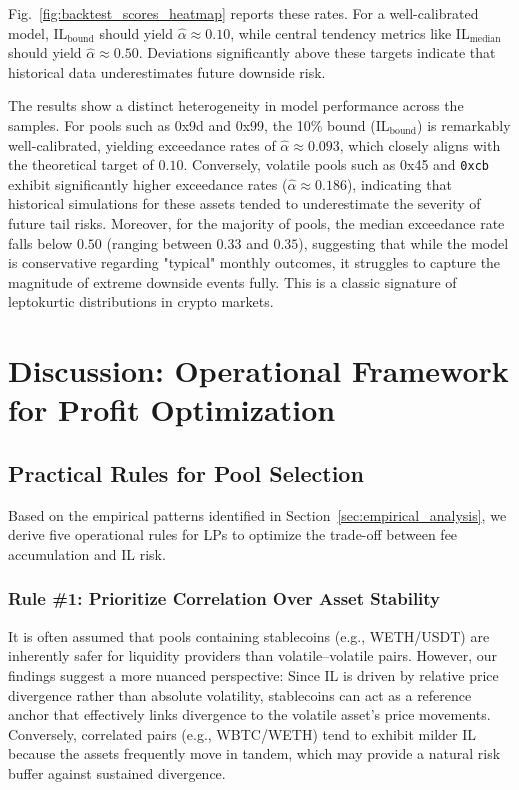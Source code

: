 \documentclass[journal]{IEEEtran}
\begin{document}
Fig.~\ref{fig:backtest_scores_heatmap} reports these rates. 
For a well-calibrated model, $\mathrm{IL}_{\text{bound}}$ should yield $\hat{\alpha} \approx 0.10$, while central tendency metrics like $\mathrm{IL}_{\text{median}}$ should yield $\hat{\alpha} \approx 0.50$. 
Deviations significantly above these targets indicate that historical data underestimates future downside risk.

The results show a distinct heterogeneity in model performance across the samples. 
For pools such as 0x9d and 0x99, the 10\% bound ($\mathrm{IL}_{\text{bound}}$) is remarkably well-calibrated, yielding exceedance rates of $\hat{\alpha} \approx 0.093$, which closely aligns with the theoretical target of $0.10$. 
Conversely, volatile pools such as 0x45 and \texttt{0xcb} exhibit significantly higher exceedance rates ($\hat{\alpha} \approx 0.186$), indicating that historical simulations for these assets tended to underestimate the severity of future tail risks. 
Moreover, for the majority of pools, the median exceedance rate falls below $0.50$ (ranging between $0.33$ and $0.35$), suggesting that while the model is conservative regarding "typical" monthly outcomes, it struggles to capture the magnitude of extreme downside events fully. This is a classic signature of leptokurtic distributions in crypto markets.

\section{Discussion: Operational Framework for Profit Optimization}
\label{sec:discussion}

\subsection{Practical Rules for Pool Selection}
Based on the empirical patterns identified in Section~\ref{sec:empirical_analysis}, we derive five operational rules for LPs to optimize the trade-off between fee accumulation and IL risk.

\subsubsection{Rule \#1: Prioritize Correlation Over Asset Stability}
It is often assumed that pools containing stablecoins (e.g., WETH/USDT) are inherently safer for liquidity providers than volatile--volatile pairs. However, our findings suggest a more nuanced perspective: Since IL is driven by relative price divergence rather than absolute volatility, stablecoins can act as a reference anchor that effectively links divergence to the volatile asset's price movements. Conversely, correlated pairs (e.g., WBTC/WETH) tend to exhibit milder IL because the assets frequently move in tandem, which may provide a natural risk buffer against sustained divergence.
\end{document}
